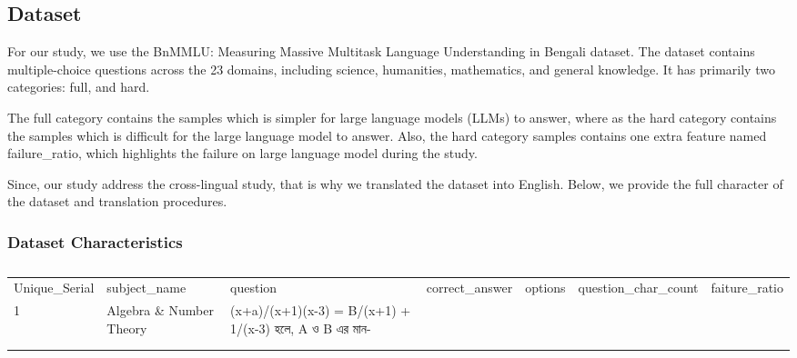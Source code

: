 \documentclass[runningheads]{llncs}
\begin{document}
\subsection{Dataset}

For our study, we use the BnMMLU: Measuring Massive Multitask Language Understanding in Bengali \cite{joy-shatabda-2026-bnmmlu} dataset. The dataset contains multiple-choice questions across the 23 domains, including science, humanities, mathematics, and general knowledge. It has primarily two categories: full, and hard.

The full category contains the samples which is simpler for large language models (LLMs) to answer, where as the hard category contains the samples which is difficult for the large language model to answer. Also, the hard category samples contains one extra feature named failure\_ratio, which highlights the failure on large language model during the study.

Since, our study address the cross-lingual study, that is why we translated the dataset into English. Below, we provide the full character of the dataset and translation procedures.

\subsubsection{Dataset Characteristics}

\begin{table}[]
	\centering
	\begin{tabular}{@{}lllllll@{}}
		\cmidrule(r){1-5}
		Unique\_Serial & subject\_name            & question                                              & correct\_answer & options & question\_char\_count & faiture\_ratio \\ \cmidrule(r){1-5}
		1              & Algebra \& Number Theory & (x+a)/(x+1)(x-3) = B/(x+1) + 1/(x-3) হলে, A ও B এর মান- &                 &         &                       &                \\
		               &                          &                                                       &                 &         &                       &                \\
		               &                          &                                                       &                 &         &                       &                \\ \cmidrule(r){1-5}
	\end{tabular}
	\caption{}
	\label{tab:my-table}
\end{table}
\end{document}
